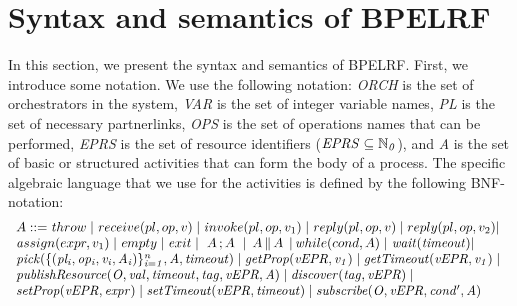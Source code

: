 \section{Syntax and semantics of BPELRF}\label{ops}
In this section, we present the syntax and semantics of BPELRF. First, we introduce some notation.
We use the following notation: {\it ORCH} is the set of orchestrators in the system, {\it VAR} is the set of integer variable names, {\it PL} is the set of necessary partnerlinks, {\it OPS} is the set of operations names that can be performed, {\it EPRS} is the set of resource identifiers (${\it EPRS\subseteq\mathbb{N}_{0}}$), and {\it A} is the set of basic or structured activities that can form the body of a process. The specific algebraic language that we use
for the activities is defined by the following BNF-notation:
%
\[\begin{array}{l}
  A ::=  {\mathit throw} \;|\;           %
         {\mathit receive(pl,op,v)} \;|\;  %
         {\mathit invoke(pl,op,v_1)} \;|\;
         {\mathit reply(pl,op,v)}\;|\;  %
         {\mathit \overline{reply(pl,op,v_2)}}\hspace{-0.1cm}\;|\;\\
         {\mathit assign(expr,v_1)} \;|\;
         {\mathit empty}\;|\;
         {\mathit exit}\;|\;
         \,\,A \,; A \,\, \;|\, %
         \;A \,\| \, A \;\,|\,   %
         {\mathit while(cond,A)}\;|\ 
         {\it wait(timeout)}\hspace{-0.1cm}\;|\;\\
         {\it pick(\{(pl_i,op_i,v_i,A_i)\}_{i=1}^n,A,timeout)}\;|\;
         {\it getProp(vEPR,v_1)}\;|\;
         {\it getTimeout(vEPR,v_1)}\;|\;\\
         {\it publishResource(O,val,timeout,tag,vEPR,A)}\;|\;
         {\it discover(tag,vEPR)}\;|\;\\
         {\it setProp(vEPR,expr)}\;|\;
         {\it setTimeout(vEPR,timeout)}\;|\;
         {\it subscribe(O,vEPR,cond',A)}
\end{array}
\]

